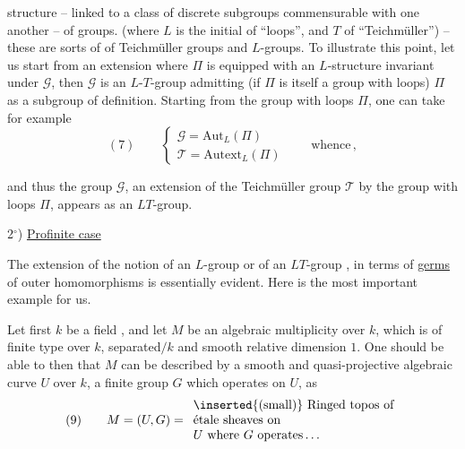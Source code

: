 
structure -- linked to a class of discrete subgroups commensurable with one another -- of groups. (where $L$ is the initial of ``loops'', and $T$ of ``Teichmüller'') -- these are sorts of  of Teichmüller groups and $L$-groups. To illustrate this point, let us start from an extension
where $\Pi$ is equipped with an $L$-structure invariant under $\mathcal{G}$, then $\mathcal{G}$ is an $L$-$T$-group admitting (if $\Pi$ is itself a group with loops) $\Pi$ as a subgroup of definition. Starting from the group with loops $\Pi$, one can take for example
\[
(7)\qquad
\left\{
\begin{array}{l}
\mathcal{G}=\mathrm{Aut}_{L}(\Pi)\\
\mathcal{T}=\mathrm{Autext}_{L}(\Pi)
\end{array}
\right.
\qquad\text{whence}
\,,
\]


and thus the  group $\mathcal{G}$, an extension of the Teichmüller group $\mathcal{T}$ by the group with loops $\Pi$, appears as an $LT$-group.



2$^\circ$) \uline{Profinite case}

The extension of the notion of an $L$-group or of an $LT$-group \inserted{$\Pi$}, in terms of \uline{germs} of outer homomorphisms
is essentially evident. Here is the most important example for us. 

Let first $k$ be a field , and let $M$ be an   algebraic multiplicity over $k$, which is  of finite type over $k$,  separated$/k$ and smooth  relative dimension $1$. One should be able to  then that $M$ can be described by a smooth and quasi-projective algebraic curve $U$ over $k$, a finite group  $G$ which operates on $U$,  as
\[
(9)\qquad M=(U,G)=
\begin{array}{l}
\inserted{\text{(small)}}\text{ Ringed topos of}\\
\text{étale sheaves on}\\
U\text{ where }G\text{ operates}\ldots
\end{array}
\]

